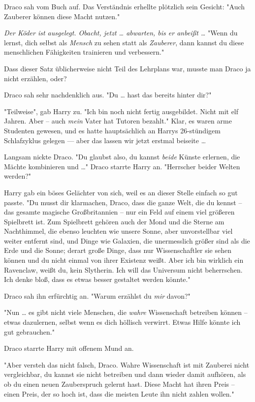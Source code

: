 {Draco sah vom Buch auf. Das Verständnis erhellte plötzlich sein Gesicht: "Auch Zauberer können diese Macht nutzen."

\emph{Der Köder ist ausgelegt. Obacht, jetzt … abwarten, bis er anbeißt …} "Wenn du lernst, dich selbst als \emph{Mensch} zu sehen statt als \emph{Zauberer}, dann kannst du diese menschlichen Fähigkeiten trainieren und verbessern."

Dass dieser Satz üblicherweise nicht Teil des Lehrplans war, musste man Draco ja nicht erzählen, oder?

Draco sah sehr nachdenklich aus. "Du … hast das bereits hinter dir?"

"Teilweise", gab Harry zu. "Ich bin noch nicht fertig ausgebildet. Nicht mit elf Jahren. Aber -- auch \emph{mein} Vater hat Tutoren bezahlt." Klar, es waren arme Studenten gewesen, und es hatte hauptsächlich an Harrys 26-stündigem Schlafzyklus gelegen --- aber das lassen wir jetzt erstmal beiseite …

Langsam nickte Draco. "Du glaubst also, du kannst \emph{beide} Künste erlernen, die Mächte kombinieren und …" Draco starrte Harry an. "Herrscher beider Welten werden?"

Harry gab ein böses Gelächter von sich, weil es an dieser Stelle einfach so gut passte. "Du musst dir klarmachen, Draco, dass die ganze Welt, die du kennst -- das gesamte magische Großbritannien -- nur ein Feld auf einem viel größeren Spielbrett ist. Zum Spielbrett gehören auch der Mond und die Sterne am Nachthimmel, die ebenso leuchten wie unsere Sonne, aber unvorstellbar viel weiter entfernt sind, und Dinge wie Galaxien, die unermesslich größer sind als die Erde und die Sonne; derart große Dinge, dass nur Wissenschaftler sie sehen können und du nicht einmal von ihrer Existenz weißt. Aber ich bin wirklich ein Ravenclaw, weißt du, kein Slytherin. Ich will das Universum nicht beherrschen. Ich denke bloß, dass es etwas besser gestaltet werden könnte."

Draco sah ihn erfürchtig an. "Warum erzählst du \emph{mir} davon?"

"Nun … es gibt nicht viele Menschen, die \emph{wahre} Wissenschaft betreiben können -- etwas dazulernen, selbst wenn es dich höllisch verwirrt. Etwas Hilfe könnte ich gut gebrauchen."

Draco starrte Harry mit offenem Mund an.

"Aber versteh das nicht falsch, Draco. Wahre Wissenschaft ist mit Zauberei nicht vergleichbar, du kannst sie nicht betreiben und dann wieder damit aufhören, als ob du einen neuen Zauberspruch gelernt hast. Diese Macht hat ihren Preis -- einen Preis, der so hoch ist, dass die meisten Leute ihn nicht zahlen wollen."

}
